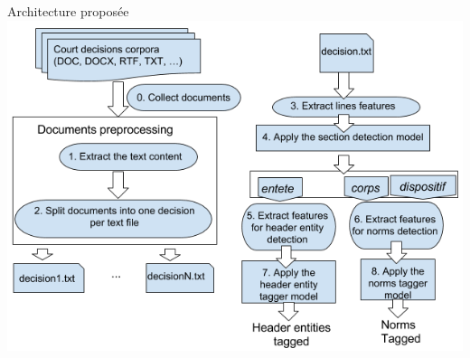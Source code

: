 \documentclass[newPxFont,pagenumber]{beamer}
\begin{document}
\begin{frame}{Architecture proposée}
\includegraphics [width=\textwidth]{archAppli.png}
\end{frame}
\end{document}

